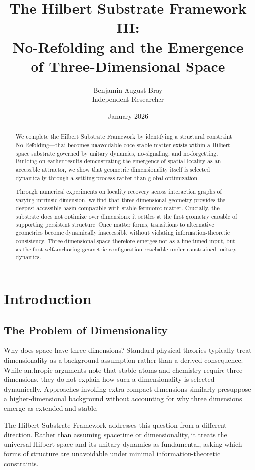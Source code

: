 \documentclass[11pt]{article}
\title{\textbf{The Hilbert Substrate Framework III:}\\
No-Refolding and the Emergence of Three-Dimensional Space}
\author{Benjamin August Bray\\
\small Independent Researcher}
\date{January 2026}
\begin{document}
\maketitle

\begin{abstract}
We complete the Hilbert Substrate Framework by identifying a structural constraint---No-Refolding---that becomes unavoidable once stable matter exists within a Hilbert-space substrate governed by unitary dynamics, no-signaling, and no-forgetting. Building on earlier results demonstrating the emergence of spatial locality as an accessible attractor, we show that geometric dimensionality itself is selected dynamically through a settling process rather than global optimization.

Through numerical experiments on locality recovery across interaction graphs of varying intrinsic dimension, we find that three-dimensional geometry provides the deepest accessible basin compatible with stable fermionic matter. Crucially, the substrate does not optimize over dimensions; it settles at the first geometry capable of supporting persistent structure. Once matter forms, transitions to alternative geometries become dynamically inaccessible without violating information-theoretic consistency. Three-dimensional space therefore emerges not as a fine-tuned input, but as the first self-anchoring geometric configuration reachable under constrained unitary dynamics.
\end{abstract}

\section{Introduction}

\subsection{The Problem of Dimensionality}

Why does space have three dimensions? Standard physical theories typically treat dimensionality as a background assumption rather than a derived consequence. While anthropic arguments note that stable atoms and chemistry require three dimensions, they do not explain how such a dimensionality is selected dynamically. Approaches invoking extra compact dimensions similarly presuppose a higher-dimensional background without accounting for why three dimensions emerge as extended and stable.

The Hilbert Substrate Framework addresses this question from a different direction. Rather than assuming spacetime or dimensionality, it treats the universal Hilbert space and its unitary dynamics as fundamental, asking which forms of structure are unavoidable under minimal information-theoretic constraints.
\end{document}
